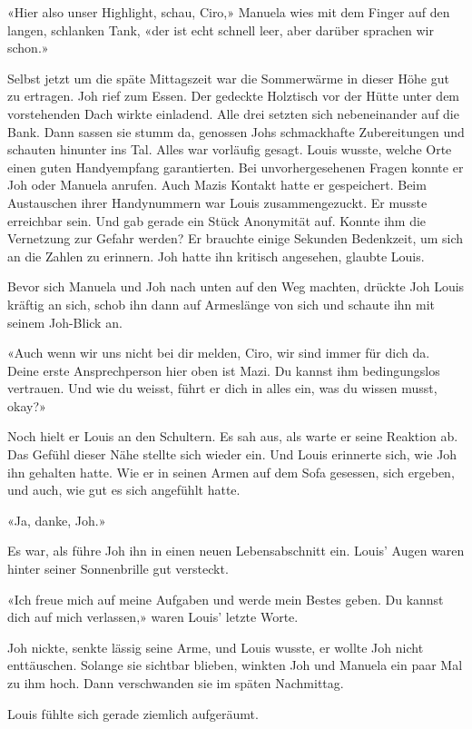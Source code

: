 «Hier also unser Highlight, schau, Ciro,» Manuela wies mit dem Finger
auf den langen, schlanken Tank, «der ist echt schnell leer, aber darüber
sprachen wir schon.»

Selbst jetzt um die späte Mittagszeit war die Sommerwärme in dieser Höhe
gut zu ertragen. Joh rief zum Essen. Der gedeckte Holztisch vor der
Hütte unter dem vorstehenden Dach wirkte einladend. Alle drei setzten
sich nebeneinander auf die Bank.
Dann sassen sie stumm da, genossen Johs schmackhafte Zubereitungen und
schauten hinunter ins Tal. Alles war vorläufig gesagt.
Louis wusste, welche Orte einen guten Handyempfang garantierten. Bei
unvorhergesehenen Fragen konnte er Joh oder Manuela anrufen. Auch Mazis
Kontakt hatte er gespeichert. Beim Austauschen ihrer Handynummern war
Louis zusammengezuckt. Er musste erreichbar sein. Und gab gerade ein
Stück Anonymität auf. Konnte ihm die Vernetzung zur Gefahr werden? Er
brauchte einige Sekunden Bedenkzeit, um sich an die Zahlen zu erinnern.
Joh hatte ihn kritisch angesehen, glaubte Louis.

Bevor sich Manuela und Joh nach unten auf den Weg machten, drückte Joh Louis kräftig an sich, schob ihn dann auf Armeslänge von sich und schaute ihn mit seinem Joh-Blick an.

«Auch wenn wir uns nicht bei dir melden, Ciro, wir sind immer für dich
da. Deine erste Ansprechperson hier oben ist Mazi. Du kannst ihm
bedingungslos vertrauen. Und wie du weisst, führt er dich in alles ein,
was du wissen musst, okay?»

Noch hielt er Louis an den Schultern. Es sah aus, als warte er seine
Reaktion ab. Das Gefühl dieser Nähe stellte sich wieder ein. Und Louis
erinnerte sich, wie Joh ihn gehalten hatte. Wie er in seinen Armen auf
dem Sofa gesessen, sich ergeben, und auch, wie gut es sich angefühlt
hatte.

«Ja, danke, Joh.»

Es war, als führe Joh ihn in einen neuen
Lebensabschnitt ein. Louis’ Augen waren hinter seiner Sonnenbrille gut
versteckt.

«Ich freue mich auf meine Aufgaben und werde mein Bestes geben. Du
kannst dich auf mich verlassen,» waren Louis’ letzte Worte.

Joh nickte, senkte lässig seine Arme, und Louis wusste, er wollte Joh
nicht enttäuschen.
Solange sie sichtbar blieben, winkten Joh und Manuela ein paar Mal zu
ihm hoch.
Dann verschwanden sie im späten Nachmittag.

Louis fühlte sich gerade ziemlich aufgeräumt.
